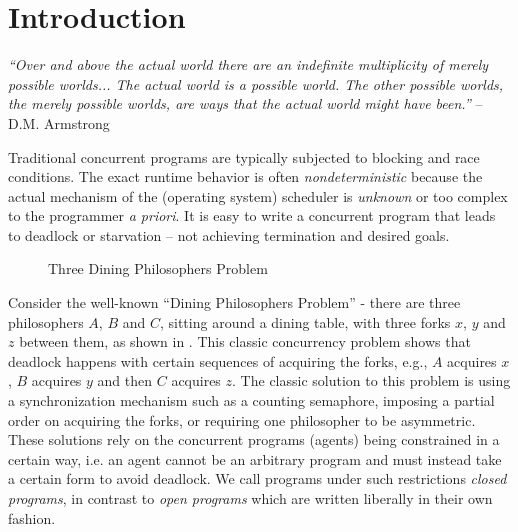 \section{Introduction}\label{sec:intro}

{\em ``Over and above the actual world there are an indefinite multiplicity
of merely possible worlds... The actual world is a possible world. The other
possible worlds, the merely possible worlds, are ways that the actual world
might have been.''} \cite{Armstrong89:worlds} -- D.M. Armstrong

\vspace*{3mm}
Traditional concurrent programs are typically subjected to blocking and race
conditions. The exact runtime behavior is often {\em nondeterministic}
because the actual mechanism of the (operating system) scheduler is
{\em unknown} or too complex to the programmer {\em a priori}.
It is easy to write a concurrent
program that leads to deadlock or starvation --  not
achieving termination and desired goals.

\begin{figure}[bh]
\centering
\caption{Three Dining Philosophers Problem}
\label{fig:dining}
\end{figure}

Consider the well-known ``Dining Philosophers Problem''
\cite{Dijkstra2002:Hierarchical} 
- there are three
philosophers $A$, $B$ and $C$, sitting around a dining table,
with three forks $x$, $y$ and $z$ between them,
as shown in . This classic concurrency problem
shows that deadlock happens with certain sequences of acquiring the forks,
e.g., $A$ acquires $x$, $B$ acquires $y$ and then
$C$ acquires $z$. 
The classic solution to this problem is using a synchronization mechanism 
such as a counting semaphore, imposing a partial order on acquiring the forks, 
or requiring one philosopher to be asymmetric.
These solutions rely on the concurrent programs (agents) being
constrained in a certain way,
i.e. an agent cannot be an arbitrary program and must instead take
a certain form to avoid deadlock.
We call programs under such restrictions {\em closed programs}, 
in contrast to {\em open programs} which are written liberally in
their own fashion.


